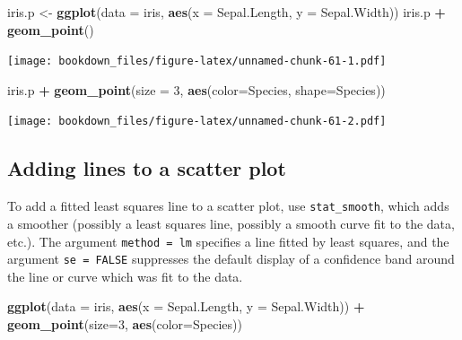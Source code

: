 \documentclass[]{krantz}
\makeatletter
\newenvironment{Shaded}{\begin{snugshade}}{\end{snugshade}}
\newcommand{\KeywordTok}[1]{\textcolor[rgb]{0.27,0.27,0.27}{\textbf{#1}}}
\newcommand{\DataTypeTok}[1]{\textcolor[rgb]{0.27,0.27,0.27}{#1}}
\newcommand{\DecValTok}[1]{\textcolor[rgb]{0.06,0.06,0.06}{#1}}
\newcommand{\StringTok}[1]{\textcolor[rgb]{0.5,0.5,0.5}{#1}}
\newcommand{\OperatorTok}[1]{\textcolor[rgb]{0.43,0.43,0.43}{\textbf{#1}}}
\newcommand{\NormalTok}[1]{#1}
\newenvironment{kframe}{%
\medskip{}
\setlength{\fboxsep}{.8em}
 \def\at@end@of@kframe{}%
 \ifinner\ifhmode%
  \def\at@end@of@kframe{\end{minipage}}%
  \begin{minipage}{\columnwidth}%
 \fi\fi%
 \def\FrameCommand##1{\hskip\@totalleftmargin \hskip-\fboxsep
 \colorbox{shadecolor}{##1}\hskip-\fboxsep
     \hskip-\linewidth \hskip-\@totalleftmargin \hskip\columnwidth}%
 \MakeFramed {\advance\hsize-\width
   \@totalleftmargin\z@ \linewidth\hsize
   \@setminipage}}%
 {\par\unskip\endMakeFramed%
 \at@end@of@kframe}
\renewenvironment{Shaded}{\begin{kframe}}{\end{kframe}}
\makeatother
\begin{document}
\begin{Shaded}
\begin{Highlighting}[]
\NormalTok{iris.p <-}\StringTok{ }\KeywordTok{ggplot}\NormalTok{(}\DataTypeTok{data =}\NormalTok{ iris, }\KeywordTok{aes}\NormalTok{(}\DataTypeTok{x =}\NormalTok{ Sepal.Length, }\DataTypeTok{y =}\NormalTok{ Sepal.Width)) }
\NormalTok{iris.p }\OperatorTok{+}\StringTok{ }\KeywordTok{geom_point}\NormalTok{()}
\end{Highlighting}
\end{Shaded}

\texttt{[image: bookdown\_files/figure-latex/unnamed-chunk-61-1.pdf]}

\begin{Shaded}
\begin{Highlighting}[]
\NormalTok{iris.p }\OperatorTok{+}\StringTok{ }\KeywordTok{geom_point}\NormalTok{(}\DataTypeTok{size =} \DecValTok{3}\NormalTok{, }\KeywordTok{aes}\NormalTok{(}\DataTypeTok{color=}\NormalTok{Species, }\DataTypeTok{shape=}\NormalTok{Species))}
\end{Highlighting}
\end{Shaded}

\texttt{[image: bookdown\_files/figure-latex/unnamed-chunk-61-2.pdf]}

\subsection{Adding lines to a scatter
plot}\label{adding-lines-to-a-scatter-plot}

To add a fitted least squares line to a scatter plot, use
\texttt{stat\_smooth}, which adds a smoother (possibly a least squares
line, possibly a smooth curve fit to the data, etc.). The argument
\texttt{method\ =\ lm} specifies a line fitted by least squares, and the
argument \texttt{se\ =\ FALSE} suppresses the default display of a
confidence band around the line or curve which was fit to the data.

\begin{Shaded}
\begin{Highlighting}[]
\KeywordTok{ggplot}\NormalTok{(}\DataTypeTok{data =}\NormalTok{ iris, }\KeywordTok{aes}\NormalTok{(}\DataTypeTok{x =}\NormalTok{ Sepal.Length, }\DataTypeTok{y =}\NormalTok{ Sepal.Width)) }\OperatorTok{+}\StringTok{ }
\StringTok{    }\KeywordTok{geom_point}\NormalTok{(}\DataTypeTok{size=}\DecValTok{3}\NormalTok{, }\KeywordTok{aes}\NormalTok{(}\DataTypeTok{color=}\NormalTok{Species))}
\end{Highlighting}
\end{Shaded}
\end{document}
